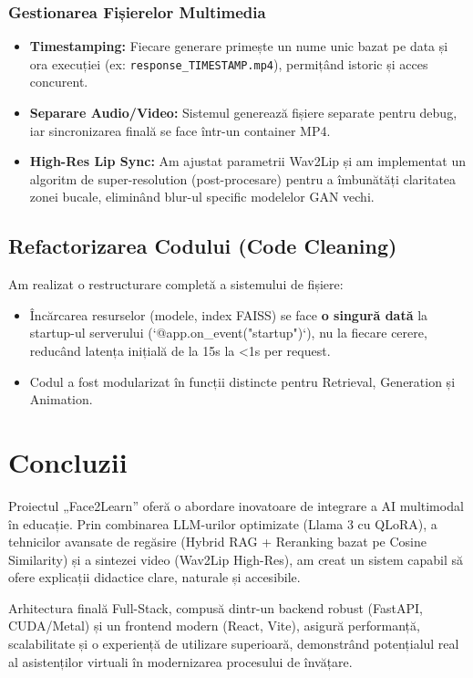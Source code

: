 \documentclass[12pt,a4paper]{report}
\begin{document}
\subsection{Gestionarea Fișierelor Multimedia}
\begin{itemize}
    \item \textbf{Timestamping:} Fiecare generare primește un nume unic bazat pe data și ora execuției (ex: \texttt{response\_TIMESTAMP.mp4}), permițând istoric și acces concurent.
    \item \textbf{Separare Audio/Video:} Sistemul generează fișiere separate pentru debug, iar sincronizarea finală se face într-un container MP4.
    \item \textbf{High-Res Lip Sync:} Am ajustat parametrii Wav2Lip și am implementat un algoritm de super-resolution (post-procesare) pentru a îmbunătăți claritatea zonei bucale, eliminând blur-ul specific modelelor GAN vechi.
\end{itemize}

\section{Refactorizarea Codului (Code Cleaning)}
Am realizat o restructurare completă a sistemului de fișiere:
\begin{itemize}
    \item Încărcarea resurselor (modele, index FAISS) se face \textbf{o singură dată} la startup-ul serverului (`@app.on\_event("startup")`), nu la fiecare cerere, reducând latența inițială de la 15s la <1s per request.
    \item Codul a fost modularizat în funcții distincte pentru Retrieval, Generation și Animation.
\end{itemize}

\chapter*{Concluzii}
Proiectul „Face2Learn” oferă o abordare inovatoare de integrare a AI multimodal în educație. Prin combinarea LLM-urilor optimizate (Llama 3 cu QLoRA), a tehnicilor avansate de regăsire (Hybrid RAG + Reranking bazat pe Cosine Similarity) și a sintezei video (Wav2Lip High-Res), am creat un sistem capabil să ofere explicații didactice clare, naturale și accesibile.

Arhitectura finală Full-Stack, compusă dintr-un backend robust (FastAPI, CUDA/Metal) și un frontend modern (React, Vite), asigură performanță, scalabilitate și o experiență de utilizare superioară, demonstrând potențialul real al asistenților virtuali în modernizarea procesului de învățare.
\end{document}
